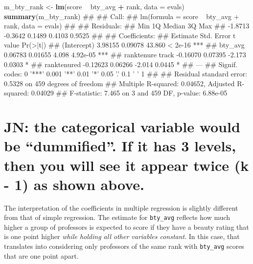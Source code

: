 \documentclass[]{article}
\newenvironment{Shaded}{\begin{snugshade}}{\end{snugshade}}
\newcommand{\KeywordTok}[1]{\textcolor[rgb]{0.13,0.29,0.53}{\textbf{#1}}}
\newcommand{\DataTypeTok}[1]{\textcolor[rgb]{0.13,0.29,0.53}{#1}}
\newcommand{\StringTok}[1]{\textcolor[rgb]{0.31,0.60,0.02}{#1}}
\newcommand{\OperatorTok}[1]{\textcolor[rgb]{0.81,0.36,0.00}{\textbf{#1}}}
\newcommand{\NormalTok}[1]{#1}
\begin{document}
\begin{Shaded}
\begin{Highlighting}[]
\NormalTok{m_bty_rank <-}\StringTok{ }\KeywordTok{lm}\NormalTok{(score }\OperatorTok{~}\StringTok{ }\NormalTok{bty_avg }\OperatorTok{+}\StringTok{ }\NormalTok{rank, }\DataTypeTok{data =}\NormalTok{ evals)}
\KeywordTok{summary}\NormalTok{(m_bty_rank)}
\NormalTok{## }
\NormalTok{## Call:}
\NormalTok{## lm(formula = score ~ bty_avg + rank, data = evals)}
\NormalTok{## }
\NormalTok{## Residuals:}
\NormalTok{##     Min      1Q  Median      3Q     Max }
\NormalTok{## -1.8713 -0.3642  0.1489  0.4103  0.9525 }
\NormalTok{## }
\NormalTok{## Coefficients:}
\NormalTok{##                  Estimate Std. Error t value Pr(>|t|)    }
\NormalTok{## (Intercept)       3.98155    0.09078  43.860  < 2e-16 ***}
\NormalTok{## bty_avg           0.06783    0.01655   4.098 4.92e-05 ***}
\NormalTok{## ranktenure track -0.16070    0.07395  -2.173   0.0303 *  }
\NormalTok{## ranktenured      -0.12623    0.06266  -2.014   0.0445 *  }
\NormalTok{## ---}
\NormalTok{## Signif. codes:  0 '***' 0.001 '**' 0.01 '*' 0.05 '.' 0.1 ' ' 1}
\NormalTok{## }
\NormalTok{## Residual standard error: 0.5328 on 459 degrees of freedom}
\NormalTok{## Multiple R-squared:  0.04652,    Adjusted R-squared:  0.04029 }
\NormalTok{## F-statistic: 7.465 on 3 and 459 DF,  p-value: 6.88e-05}
\end{Highlighting}
\end{Shaded}

\section{\texorpdfstring{JN: the categorical variable would be
``dummified''. If it has 3 levels, then you will see it appear twice (k
- 1) as shown
above.}{JN: the categorical variable would be dummified. If it has 3 levels, then you will see it appear twice (k - 1) as shown above.}}\label{jn-the-categorical-variable-would-be-dummified.-if-it-has-3-levels-then-you-will-see-it-appear-twice-k---1-as-shown-above.}

The interpretation of the coefficients in multiple regression is
slightly different from that of simple regression. The estimate for
\texttt{bty\_avg} reflects how much higher a group of professors is
expected to score if they have a beauty rating that is one point higher
\emph{while holding all other variables constant}. In this case, that
translates into considering only professors of the same rank with
\texttt{bty\_avg} scores that are one point apart.
\end{document}
